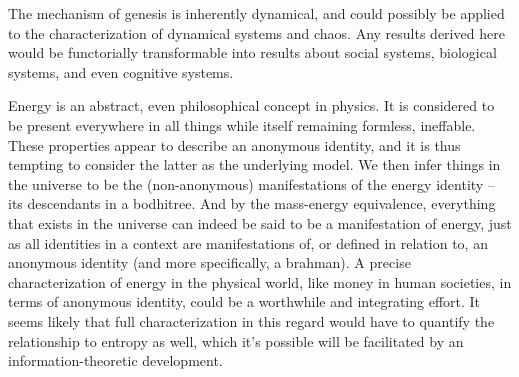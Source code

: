 \documentclass[pra,twocolumn,groupedaddress,10pt]{revtex4}
\theoremstyle{definition}
\begin{document}
The mechanism of genesis is inherently dynamical, and could possibly be applied to the characterization of dynamical systems and chaos. Any results derived here would be functorially transformable into results about social systems, biological systems, and even cognitive systems.

Energy is an abstract, even philosophical concept in physics. It is considered to be present everywhere in all things while itself remaining formless, ineffable. These properties appear to describe an anonymous identity, and it is thus tempting to consider the latter as the underlying model. We then infer things in the universe to be the (non-anonymous) manifestations of the energy identity -- its descendants in a bodhitree. And by the mass-energy equivalence, everything that exists in the universe can indeed be said to be a manifestation of energy, just as all identities in a context are manifestations of, or defined in relation to, an anonymous identity (and more specifically, a brahman). A precise characterization of energy in the physical world, like money in human societies, in terms of anonymous identity, could be a worthwhile and integrating effort. It seems likely that full characterization in this regard would have to quantify the relationship to entropy as well, which it's possible will be facilitated by an information-theoretic development.
\end{document}
